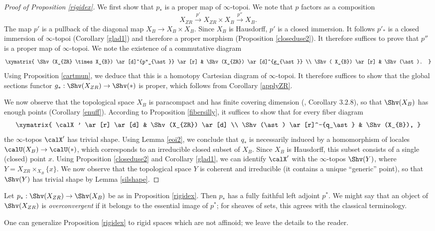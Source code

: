 \begin{proof}[Proof of Proposition \ref{rigidex}]
We first show that $p_{\ast}$ is a proper map of $\infty$-topoi. We note that $p$ factors as a composition
$$ X_{ZR} \stackrel{p'}{\rightarrow} X_{ZR} \times X_{B} \stackrel{p''}{\rightarrow} X_{B}.$$
The map $p'$ is a pullback of the diagonal map $X_{B} \rightarrow X_{B} \times X_{B}$. Since
$X_{B}$ is Hausdorff, $p'$ is a closed immersion. It follows $p'_{\ast}$ is a closed immersion of $\infty$-topoi (Corollary \ref{glad1}) and therefore a proper morphism (Proposition \ref{closeduse2}). It therefore suffices to prove that $p''$ is a proper map of $\infty$-topoi. We note the existence of a commutative diagram
$$ \xymatrix{ \Shv(X_{ZR} \times X_{B}) \ar[d]^{p''_{\ast}} \ar[r] & \Shv(X_{ZR}) \ar[d]^{g_{\ast}} \\
\Shv( X_{B}) \ar[r] & \Shv(\ast). }$$
Using Proposition \ref{cartmun}, we deduce that this is a homotopy Cartesian diagram of $\infty$-topoi. It therefore suffices to show that the global sections functor $g_{\ast}: \Shv(X_{ZR}) \rightarrow \Shv(\ast)$ is proper, which follows from Corollary \ref{applyZR}.

We now observe that the topological space $X_{B}$ is paracompact and has finite covering dimension (\cite{berkovich}, Corollary $3.2.8$), so that $\Shv(X_{B})$ has enough points (Corollary \ref{enuff}). According to Proposition \ref{fibersilly}, it suffices to show that for every fiber diagram
$$ \xymatrix{ \calX' \ar[r] \ar[d] & \Shv(X_{ZR}) \ar[d] \\
\Shv(\ast) \ar[r]^-{q_\ast} & \Shv(X_{B}), }$$
the $\infty$-topos $\calX'$ has trivial shape. Using Lemma \ref{eoi2}, we conclude that $q_{\ast}$ is necessarily induced by a homomorphism of locales $\calU(X_{B}) \rightarrow \calU(\ast)$, which corresponds to an irreducible closed subset of $X_{B}$. Since $X_{B}$ is Hausdorff, this subset consists of a single (closed) point $x$. Using Proposition \ref{closeduse2} and Corollary \ref{glad1}, we can identify $\calX'$ with the $\infty$-topos $\Shv(Y)$, where $Y = X_{ZR} \times_{X_B} \{x\}$.
We now observe that the topological space $Y$ is coherent and irreducible (it contains a unique ``generic'' point), so that $\Shv(Y)$ has trivial shape by Lemma \ref{silshape}.
\end{proof}

\begin{remark}
Let $p_{\ast}: \Shv(X_{ZR}) \rightarrow \Shv(X_{B})$ be as in Proposition \ref{rigidex}.
Then $p_{\ast}$ has a fully faithful left adjoint $p^{\ast}$. We might say that an object of
$\Shv(X_{ZR})$ is {\it overconvergent} if it belongs to the essential image of $p^{\ast}$; for sheaves of sets, this agrees with the classical terminology.
\end{remark}

\begin{remark}
One can generalize Proposition \ref{rigidex} to rigid spaces which are not affinoid; we leave the details to the reader.
\end{remark}

